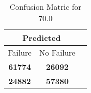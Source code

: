 \begin{table}[] 
\caption{Confusion Matric for 70.0} 
\label{Table: Prediction Accuracy-DMD70.0OnlySunEKF-ignoreReflection-Reflection} 
\centering 
\begin{tabular} 
 {@{}ccc@{}} 
\toprule 
\multicolumn{2}{c}{\textbf{Predicted}}
 \\ \midrule 
\multicolumn{1}{|c|}{Failure} & 
\multicolumn{1}{c|}{No Failure}
 \\ \midrule 
\multicolumn{1}{|c|}{\color{green}\textbf{61774}} & 
\multicolumn{1}{c|}{\color{red}\textbf{26092}}
 \\ \midrule 
\multicolumn{1}{|c|}{\color{red}\textbf{24882}} & 
\multicolumn{1}{c|}{\color{green}\textbf{57380}}
 \\ \bottomrule 
\end{tabular} 
\end{table} 
